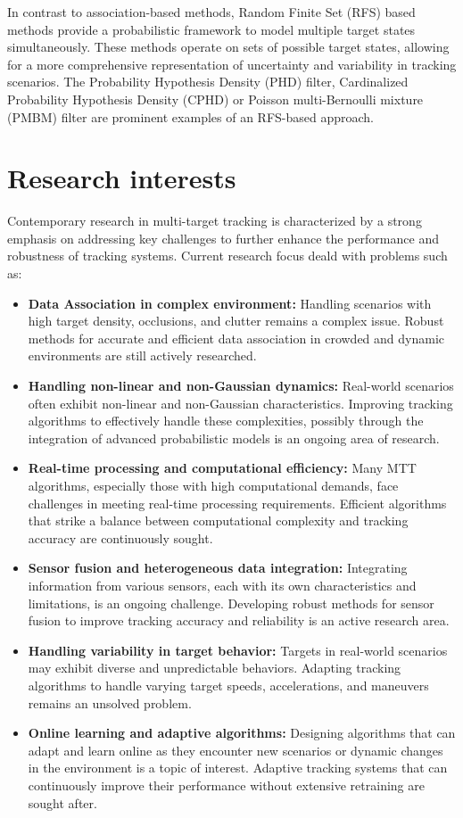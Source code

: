 In contrast to association-based methods, Random Finite Set (RFS) based methods provide a probabilistic framework to model multiple target states simultaneously. These methods operate on sets of possible target states, allowing for a more comprehensive representation of uncertainty and variability in tracking scenarios. The Probability Hypothesis Density (PHD) filter, Cardinalized Probability Hypothesis Density (CPHD) or Poisson multi-Bernoulli mixture (PMBM) filter are prominent examples of an RFS-based approach.

\section{Research interests}
Contemporary research in multi-target tracking is characterized by a strong emphasis on addressing key challenges to further enhance the performance and robustness of tracking systems. Current research focus deald with problems such as:
\begin{itemize}
  \item \textbf{Data Association in complex environment:}  Handling scenarios with high target density, occlusions, and clutter remains a complex issue. Robust methods for accurate and efficient data association in crowded and dynamic environments are still actively researched.
  \item \textbf{Handling non-linear and non-Gaussian dynamics:}  Real-world scenarios often exhibit non-linear and
  non-Gaussian characteristics. Improving tracking algorithms to effectively handle these complexities, possibly through the integration of advanced probabilistic models is an ongoing area of research.
  \item \textbf{Real-time processing and computational efficiency:} Many MTT algorithms, especially those with high computational demands, face challenges in meeting real-time processing requirements. Efficient algorithms that strike a balance between computational complexity and tracking accuracy are continuously sought.
  \item \textbf{Sensor fusion and heterogeneous data integration:} Integrating information from various sensors, each with its own characteristics and limitations, is an ongoing challenge. Developing robust methods for sensor fusion to improve tracking accuracy and reliability is an active research area.
  \item \textbf{Handling variability in target behavior:} Targets in real-world scenarios may exhibit diverse and unpredictable behaviors. Adapting tracking algorithms to handle varying target speeds, accelerations, and maneuvers remains an unsolved problem.
  \item \textbf{Online learning and adaptive algorithms:} Designing algorithms that can adapt and learn online as they encounter new scenarios or dynamic changes in the environment is a topic of interest. Adaptive tracking systems that can continuously improve their performance without extensive retraining are sought after.
\end{itemize}

